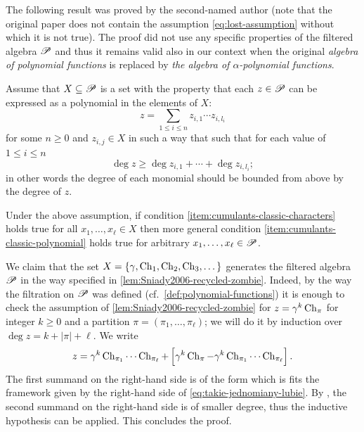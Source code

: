 \documentclass[12pt,usenames,dvipsnames,svgnames,table]{amsart}
\begin{document}
The following result was proved by the second-named author 
\cite[Corollary 19]{Sniady2006c} (note that the original paper 
does not contain the assumption \eqref{eq:lost-assumption}
without which it is not true). The proof 
did not use any specific properties of the filtered algebra $\mathscr{P}$
and thus it remains valid also in our context when the original 
\emph{algebra of polynomial functions} is replaced by 
\emph{the algebra of $\alpha$-polynomial functions}.
\begin{lemma}
	\label{lem:Sniady2006-recycled-zombie}
	Assume that $X\subseteq \mathscr{P}$ is a set with the property that 
	each $z\in\mathscr{P}$ can be expressed as a polynomial
	in the elements of $X$:
	\begin{equation}
	\label{eq:takie-jednomiany-lubie}
	z= \sum_{1\leq i \leq n}  z_{i,1} \cdots z_{i,l_i}    
	\end{equation}
	for some $n\geq 0$ and $z_{i,j}\in X$ in such a way that
	such that for each value of $1\leq i\leq n$ 
	\begin{equation}
	\label{eq:lost-assumption}
	\deg z \geq  \deg z_{i,1}+ \cdots +\deg z_{i,l_i};   
	\end{equation}
	in other words the degree of each monomial should be bounded from above by the degree of $z$.
	
	Under the above assumption, 
	if condition \ref{item:cumulants-classic-characters} holds true for all $x_1,\dots,x_\ell\in X$
	then more general condition \ref{item:cumulants-classic-polynomial} holds true for arbitrary $x_1,\dots,x_\ell\in \mathscr{P}$.
\end{lemma}

We claim that the set  $X=\{\gamma,\operatorname{Ch}_1,\operatorname{Ch}_2,\operatorname{Ch}_3,\dots\}$ generates the filtered algebra $\mathscr{P}$
in the way specified in \cref{lem:Sniady2006-recycled-zombie}. 
Indeed, by the way the filtration on $\mathscr{P}$ was defined (cf.~\cref{def:polynomial-functions})
it is enough to check the assumption of \cref{lem:Sniady2006-recycled-zombie} for
$z=\gamma^k \operatorname{Ch}_{\pi}$ for integer $k\geq 0$ and a partition $\pi=(\pi_1,\dots,\pi_\ell)$;
we will do it by induction over $\deg z=k+|\pi|+\ell$.
We write 
\[ z=  \gamma^k \operatorname{Ch}_{\pi_1}\cdots \operatorname{Ch}_{\pi_\ell} + \left[  \gamma^k \operatorname{Ch}_{\pi} - \gamma^k \operatorname{Ch}_{\pi_1}\cdots \operatorname{Ch}_{\pi_\ell} \right]. \]
The first summand on the right-hand side is of the form which is fits the framework
given by the right-hand side of \eqref{eq:takie-jednomiany-lubie}.
By \cite[Corollary 2.5, Corollary 3.8]{DolegaFeray2014}, the second summand on the right-hand side is of smaller degree,
thus the inductive hypothesis can be applied. This concludes the proof.
\end{document}
